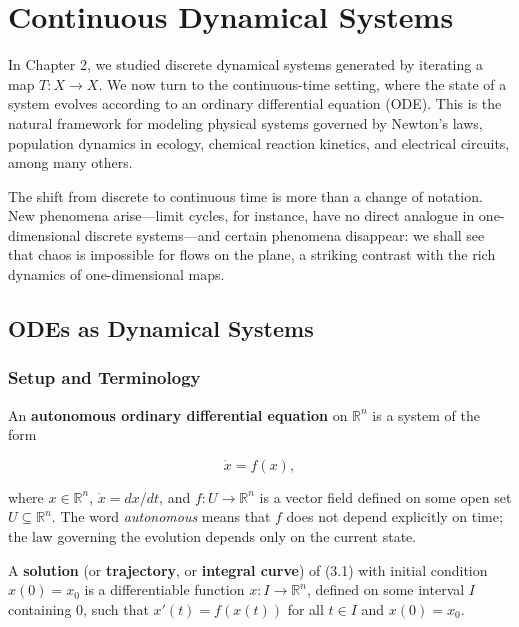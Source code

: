 \chapter{Continuous Dynamical Systems}\label{ch:3}

In Chapter 2, we studied discrete dynamical systems generated by iterating a map $T: X \to X$. We now turn to the continuous-time setting, where the state of a system evolves according to an ordinary differential equation (ODE). This is the natural framework for modeling physical systems governed by Newton's laws, population dynamics in ecology, chemical reaction kinetics, and electrical circuits, among many others.

The shift from discrete to continuous time is more than a change of notation. New phenomena arise---limit cycles, for instance, have no direct analogue in one-dimensional discrete systems---and certain phenomena disappear: we shall see that chaos is impossible for flows on the plane, a striking contrast with the rich dynamics of one-dimensional maps.


\bigskip


\section{ODEs as Dynamical Systems}\label{sec:3.1}

\subsection{Setup and Terminology}\label{sec:3.1.1}

An \textbf{autonomous ordinary differential equation} on $\mathbb{R}^n$ is a system of the form

\begin{equation}\label{eq:3.1}\tag{3.1}
\dot{x} = f(x),
\end{equation}

where $x \in \mathbb{R}^n$, $\dot{x} = dx/dt$, and $f: U \to \mathbb{R}^n$ is a vector field defined on some open set $U \subseteq \mathbb{R}^n$. The word \textit{autonomous} means that $f$ does not depend explicitly on time; the law governing the evolution depends only on the current state.

A \textbf{solution} (or \textbf{trajectory}, or \textbf{integral curve}) of (3.1) with initial condition $x(0) = x_0$ is a differentiable function $x: I \to \mathbb{R}^n$, defined on some interval $I$ containing $0$, such that $x'(t) = f(x(t))$ for all $t \in I$ and $x(0) = x_0$.

